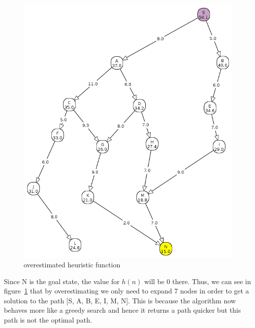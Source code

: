 \documentclass[11pt, A4]{article}
\begin{document}
\begin{figure}[H]
\centering
\includegraphics[width = \textwidth]{./overestimate.png}
\caption{overestimated heuristic function}
\label{fig:2c-overestimate}
\end{figure}

\noindent Since N is the goal state, the value for $h(n)$ will be 0 there. Thus, we can see in figure~\ref{fig:2c-overestimate} that by overestimating we only need to expand 7 nodes in order to get a solution to the path [S, A, B, E, I, M, N]. This is because the algorithm now behaves more like a greedy search and hence it returns a path quicker but this path is not the optimal path. 
\end{document}
